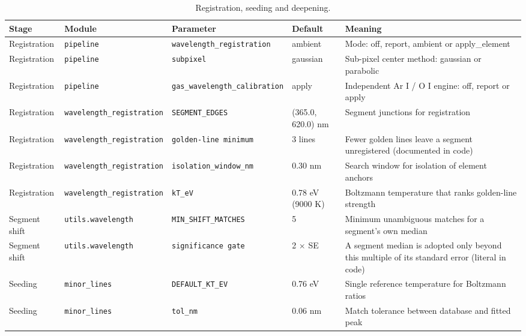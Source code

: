 \begin{table}[!htbp]
\centering
\caption{Registration, seeding and deepening.}
\label{tab:params-seed}
\scriptsize
\setlength{\tabcolsep}{4pt}
\begin{tabular}{@{}p{}p{}p{}p{}p{}@{}}
\toprule
Stage & Module & Parameter & Default & Meaning \\
\midrule
Registration & \texttt{pipeline} & \texttt{wavelength\_\allowbreak{}registration} & ambient & Mode: off, report, ambient or apply\_element \\
Registration & \texttt{pipeline} & \texttt{subpixel} & gaussian & Sub-pixel center method: gaussian or parabolic \\
Registration & \texttt{pipeline} & \texttt{gas\_\allowbreak{}wavelength\_\allowbreak{}calibration} & apply & Independent Ar I / O I engine: off, report or apply \\
Registration & \texttt{wavelength\_\allowbreak{}registration} & \texttt{SEGMENT\_\allowbreak{}EDGES} & (365.0, 620.0) nm & Segment junctions for registration \\
Registration & \texttt{wavelength\_\allowbreak{}registration} & \texttt{golden-line minimum} & 3 lines & Fewer golden lines leave a segment unregistered (documented in code) \\
Registration & \texttt{wavelength\_\allowbreak{}registration} & \texttt{isolation\_\allowbreak{}window\_\allowbreak{}nm} & 0.30 nm & Search window for isolation of element anchors \\
Registration & \texttt{wavelength\_\allowbreak{}registration} & \texttt{kT\_\allowbreak{}eV} & 0.78 eV (9000 K) & Boltzmann temperature that ranks golden-line strength \\
Segment shift & \texttt{utils.wavelength} & \texttt{MIN\_\allowbreak{}SHIFT\_\allowbreak{}MATCHES} & 5 & Minimum unambiguous matches for a segment's own median \\
Segment shift & \texttt{utils.wavelength} & \texttt{significance gate} & 2 $\times$ SE & A segment median is adopted only beyond this multiple of its standard error (literal in code) \\
Seeding & \texttt{minor\_\allowbreak{}lines} & \texttt{DEFAULT\_\allowbreak{}KT\_\allowbreak{}EV} & 0.76 eV & Single reference temperature for Boltzmann ratios \\
Seeding & \texttt{minor\_\allowbreak{}lines} & \texttt{tol\_\allowbreak{}nm} & 0.06 nm & Match tolerance between database and fitted peak \\

\end{tabular}
\end{table}
